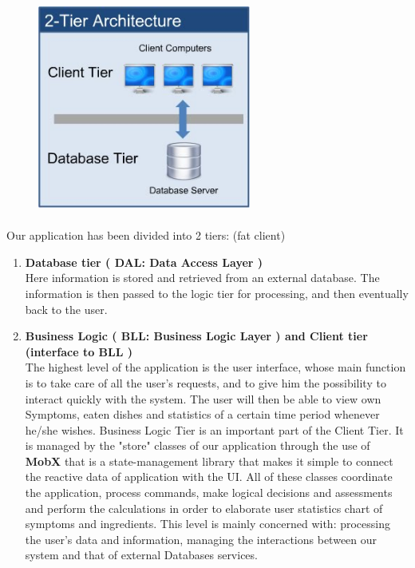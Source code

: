 \documentclass [12pt]{article}
\begin{document}
\begin{figure}[ht!]
\centering
\includegraphics[height=7cm, width=7cm]{2tier.jpg}
\end{figure}  
Our application has been divided into 2 tiers: (fat client)
\begin{enumerate}
\item \textbf{Database tier ( DAL: Data Access Layer )}\\
Here information is stored and retrieved from an external database. The information is then passed to the logic tier for processing, and then eventually back to the user.
\item \textbf{Business Logic ( BLL: Business Logic Layer ) and Client tier (interface to BLL )} 
\\
The highest level of the application is the user interface, whose main function is to take care of all the user's requests, and to give him the possibility to interact quickly with the system.
The user will then be able to view own Symptoms, eaten dishes and statistics of a certain time period whenever he/she wishes.
Business Logic Tier is an important part of the Client Tier. 
It is managed by the "store" classes of our application through the use of \textbf{MobX} that is a state-management library that makes it simple to connect the reactive data of application with the UI.
All of these classes coordinate the application, process commands, make logical decisions and assessments and perform the calculations in order to elaborate user statistics chart of symptoms and ingredients. This level is mainly concerned with: processing the user's data and information, managing the interactions between our system and that of external Databases services.
\end{enumerate}
\clearpage
\end{document}

